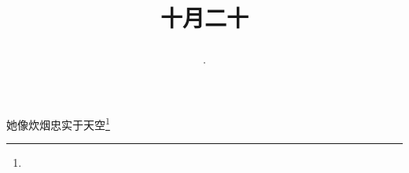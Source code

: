 \title{\date[d=20,m=11,y=2024][year:cn-y,年,month:cn,day:cn,日,·,weekday]·十月二十 }
她像炊烟忠实于天空\footnote{ }

